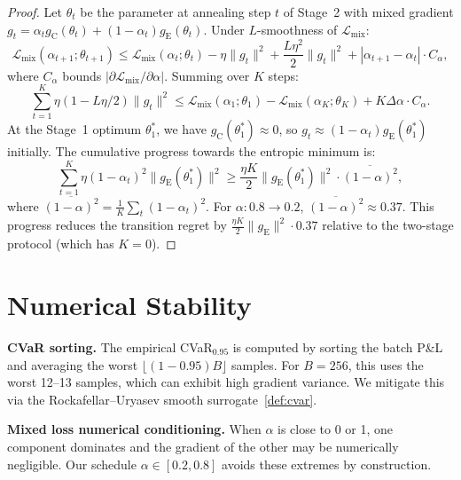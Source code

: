 \documentclass[11pt]{article}
\begin{document}
\begin{proof}
Let $\theta_t$ be the parameter at annealing step $t$ of Stage~2 with mixed gradient $g_t = \alpha_t g_{\mathrm{C}}(\theta_t) + (1-\alpha_t)g_{\mathrm{E}}(\theta_t)$.  Under $L$-smoothness of $\mathcal{L}_{\mathrm{mix}}$:
\begin{equation}
    \mathcal{L}_{\mathrm{mix}}(\alpha_{t+1};\theta_{t+1}) \le \mathcal{L}_{\mathrm{mix}}(\alpha_t;\theta_t) - \eta\|g_t\|^2 + \frac{L\eta^2}{2}\|g_t\|^2 + |\alpha_{t+1}-\alpha_t|\cdot C_\alpha,
\end{equation}
where $C_\alpha$ bounds $|\partial\mathcal{L}_{\mathrm{mix}}/\partial\alpha|$.  Summing over $K$ steps:
\begin{equation}
    \sum_{t=1}^K \eta(1 - L\eta/2)\|g_t\|^2 \le \mathcal{L}_{\mathrm{mix}}(\alpha_1;\theta_1) - \mathcal{L}_{\mathrm{mix}}(\alpha_K;\theta_K) + K\Delta\alpha\cdot C_\alpha.
\end{equation}
At the Stage~1 optimum $\theta_1^*$, we have $g_{\mathrm{C}}(\theta_1^*) \approx 0$, so $g_t \approx (1-\alpha_t)g_{\mathrm{E}}(\theta_1^*)$ initially.  The cumulative progress towards the entropic minimum is:
\begin{equation}
    \sum_{t=1}^K \eta(1-\alpha_t)^2\|g_{\mathrm{E}}(\theta_1^*)\|^2 \ge \frac{\eta K}{2}\|g_{\mathrm{E}}(\theta_1^*)\|^2 \cdot \overline{(1-\alpha)^2},
\end{equation}
where $\overline{(1-\alpha)^2} = \frac{1}{K}\sum_t(1-\alpha_t)^2$.  For $\alpha: 0.8\to 0.2$, $\overline{(1-\alpha)^2} \approx 0.37$.  This progress reduces the transition regret by $\frac{\eta K}{2}\|g_{\mathrm{E}}\|^2 \cdot 0.37$ relative to the two-stage protocol (which has $K=0$).
\end{proof}

\section{Numerical Stability}
\label{app:numerical}

\textbf{CVaR sorting.}  The empirical CVaR$_{0.95}$ is computed by sorting the batch P\&L and averaging the worst $\lfloor (1-0.95)B \rfloor$ samples.  For $B=256$, this uses the worst 12--13 samples, which can exhibit high gradient variance.  We mitigate this via the Rockafellar--Uryasev smooth surrogate~\eqref{def:cvar}.

\textbf{Mixed loss numerical conditioning.}  When $\alpha$ is close to 0 or 1, one component dominates and the gradient of the other may be numerically negligible.  Our schedule $\alpha \in [0.2, 0.8]$ avoids these extremes by construction.
\end{document}
